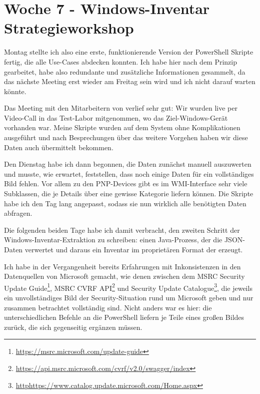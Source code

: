 \section{Woche 7 - Windows-Inventar \headerand Strategieworkshop} \label{sec:bericht-wo-7}


Montag stellte ich also eine erste, funktionierende Version der PowerShell Skripte fertig, die alle Use-Cases abdecken konnten.
Ich habe hier nach dem Prinzip  gearbeitet, habe also redundante und zusätzliche Informationen gesammelt, da das nächste Meeting erst wieder am Freitag sein wird und ich nicht darauf warten könnte.

Das Meeting mit den Mitarbeitern von {\aeclientZEZESE} verlief sehr gut:
Wir wurden live per Video-Call in das Test-Labor mitgenommen, wo das Ziel-Windows-Gerät vorhanden war.
Meine Skripte wurden auf dem System ohne Komplikationen ausgeführt und nach Besprechungen über das weitere Vorgehen haben wir diese Daten auch übermittelt bekommen.

Den Dienstag habe ich dann begonnen, die Daten zunächst manuell auszuwerten und musste, wie erwartet, feststellen, dass noch einige Daten für ein vollständiges Bild fehlen.
Vor allem zu den PNP-Devices gibt es im WMI-Interface sehr viele Subklassen, die je Details über eine gewisse Kategorie liefern können.
Die Skripte habe ich den Tag lang angepasst, sodass sie nun wirklich alle benötigten Daten abfragen.

Die folgenden beiden Tage habe ich damit verbracht, den zweiten Schritt der Windows-Inventar-Extraktion zu schreiben:
einen Java-Prozess, der die JSON-Daten verwertet und daraus ein Inventar im proprietären Format der {\metaeffekt} erzeugt.

Ich habe in der Vergangenheit bereits Erfahrungen mit Inkonsistenzen in den Datenquellen von Microsoft gemacht, wie denen zwischen dem
MSRC Security Update Guide\footnote{\url{https://msrc.microsoft.com/update-guide}},
MSRC CVRF API\footnote{\url{https://api.msrc.microsoft.com/cvrf/v2.0/swagger/index}} und
Security Update Catalogue\footnote{\url{httphttps://www.catalog.update.microsoft.com/Home.aspx}},
die jeweils ein unvollständiges Bild der Security-Situation rund um Microsoft geben und nur zusammen betrachtet vollständig sind.
Nicht anders war es hier:
die unterschiedlichen Befehle an die PowerShell liefern je Teile eines großen Bildes zurück, die sich gegenseitig ergänzen müssen.

